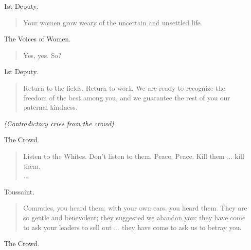 \documentclass[letterpaper,article,12pt,oneside,notitlepage]{memoir}
\begin{document}
\begin{center}1st Deputy.\end{center}

\begin{verse}
\hspace{1cm} Your women grow weary of the uncertain and unsettled life. \\
\end{verse}

\begin{center}The Voices of Women.\end{center}

\begin{verse}
\hspace{1cm} Yes, yes. So? \\
\end{verse}

\begin{center}1st Deputy.\end{center}

\begin{verse}
\indent Return to the fields. Return to work. We are ready to recognize the freedom of the best among you, and we guarantee the rest of you our paternal kindness. \\
\end{verse}

\textit{(Contradictory cries from the crowd)}

\begin{center}The Crowd.\end{center}

\begin{verse}
\hspace{1cm} Listen to the Whites. Don't listen to them. Peace. Peace. Kill them ... kill them. \\
... \\
\end{verse}

\begin{center}Toussaint.\end{center}

\begin{verse}
\indent Comrades, you heard them; with your own ears, you heard them. They are so gentle and benevolent; they suggested we abandon you; they have come to ask your leaders to sell out ... they have come to ask us to betray you. \\
\end{verse}

\begin{center}The Crowd.\end{center}
\end{document}
